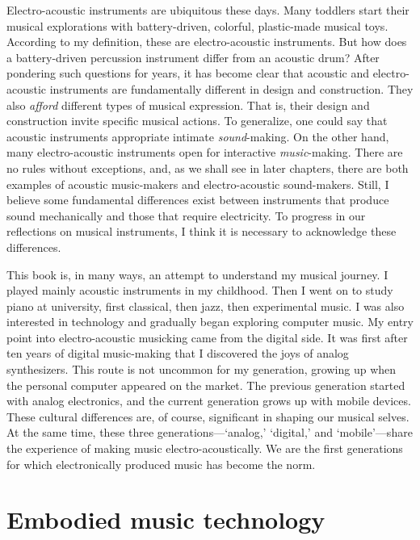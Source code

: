 Electro-acoustic instruments are ubiquitous these days. Many toddlers start their musical explorations with battery-driven, colorful, plastic-made musical toys. According to my definition, these are electro-acoustic instruments. But how does a battery-driven percussion instrument differ from an acoustic drum? After pondering such questions for years, it has become clear that acoustic and electro-acoustic instruments are fundamentally different in design and construction. They also \emph{afford} different types of musical expression. That is, their design and construction invite specific musical actions. To generalize, one could say that acoustic instruments appropriate intimate \emph{sound}-making. On the other hand, many electro-acoustic instruments open for interactive \emph{music}-making. There are no rules without exceptions, and, as we shall see in later chapters, there are both examples of acoustic music-makers and electro-acoustic sound-makers. Still, I believe some fundamental differences exist between instruments that produce sound mechanically and those that require electricity. To progress in our reflections on musical instruments, I think it is necessary to acknowledge these differences.

This book is, in many ways, an attempt to understand my musical journey. I played mainly acoustic instruments in my childhood. Then I went on to study piano at university, first classical, then jazz, then experimental music. I was also interested in technology and gradually began exploring computer music. My entry point into electro-acoustic musicking came from the digital side. It was first after ten years of digital music-making that I discovered the joys of analog synthesizers. This route is not uncommon for my generation, growing up when the personal computer appeared on the market. The previous generation started with analog electronics, and the current generation grows up with mobile devices. These cultural differences are, of course, significant in shaping our musical selves. At the same time, these three generations---`analog,' `digital,' and `mobile'---share the experience of making music electro-acoustically. We are the first generations for which electronically produced music has become the norm.


\section{Embodied music technology}

